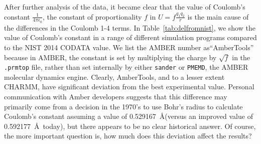 After further analysis of the data, it became clear that the value of
Coulomb's constant $\frac{1}{4 \pi \epsilon_0}$, the constant of
proportionality $f$ in $U = f\frac{q_1q_2}{r}$ is the main cause of the
differences in the Coulomb 1-4 terms. In Table~\ref{tab:delfromnist},
we show the value of Coulomb's constant in a range of different
simulation programs compared to the NIST 2014 CODATA value.  We list
the AMBER number as``AmberTools''
because in AMBER, the constant is set by multiplying the charge by
$\sqrt{f}$ in the {\tt .prmtop} file, rather than set internally by
either {\tt sander} or {\tt PMEMD}, the AMBER molecular dynamics
engine.  Clearly, AmberTools, and to a lesser extent CHARMM, have
significant deviation from the best experimental value.  Personal
communication with Amber developers suggests that this difference may
primarily come from a decision in the 1970's to use Bohr's radius to calculate
Coulomb's constant assuming a value of 0.529167~\AA (versus an
improved value of 0.592177~\AA~today), but there appears to be no clear
historical answer.  Of course, the more important question is, how
much does this deviation affect the results?

